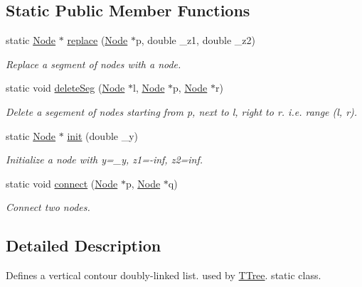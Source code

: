 \subsection*{Static Public Member Functions}
\begin{DoxyCompactItemize}
\item 
static \hyperlink{structContourList_1_1Node}{Node} $\ast$ \hyperlink{classContourList_a62250bf789d26d3392001287047e8d13}{replace} (\hyperlink{structContourList_1_1Node}{Node} $\ast$p, double \+\_\+z1, double \+\_\+z2)
\begin{DoxyCompactList}\small\item\em Replace a segment of nodes with a node. \end{DoxyCompactList}\item 
static void \hyperlink{classContourList_add57efb2cdaba0626be3138c91f5d43a}{delete\+Seg} (\hyperlink{structContourList_1_1Node}{Node} $\ast$l, \hyperlink{structContourList_1_1Node}{Node} $\ast$p, \hyperlink{structContourList_1_1Node}{Node} $\ast$r)
\begin{DoxyCompactList}\small\item\em Delete a segement of nodes starting from p, next to l, right to r. i.\+e. range (l, r). \end{DoxyCompactList}\item 
static \hyperlink{structContourList_1_1Node}{Node} $\ast$ \hyperlink{classContourList_a4a9caa54290e0ca516375429a52cf768}{init} (double \+\_\+y)
\begin{DoxyCompactList}\small\item\em Initialize a node with y=\+\_\+y, z1=-\/inf, z2=inf. \end{DoxyCompactList}\item 
static void \hyperlink{classContourList_a8aecef9a5d7ebe21b57b0e2af079fec4}{connect} (\hyperlink{structContourList_1_1Node}{Node} $\ast$p, \hyperlink{structContourList_1_1Node}{Node} $\ast$q)
\begin{DoxyCompactList}\small\item\em Connect two nodes. \end{DoxyCompactList}\end{DoxyCompactItemize}


\subsection{Detailed Description}
Defines a vertical contour doubly-\/linked list. used by \hyperlink{classTTree}{T\+Tree}. static class. 

